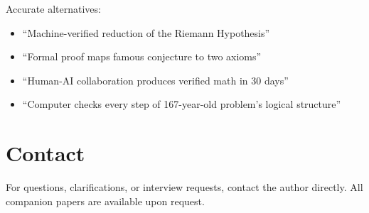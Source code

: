 \documentclass[11pt,a4paper]{article}
\begin{document}
Accurate alternatives:

\begin{itemize}
  \item ``Machine-verified reduction of the Riemann Hypothesis''
  \item ``Formal proof maps famous conjecture to two axioms''
  \item ``Human-AI collaboration produces verified math in 30 days''
  \item ``Computer checks every step of 167-year-old problem's
    logical structure''
\end{itemize}

\section{Contact}

For questions, clarifications, or interview requests, contact
the author directly. All companion papers are available upon
request.
\end{document}
